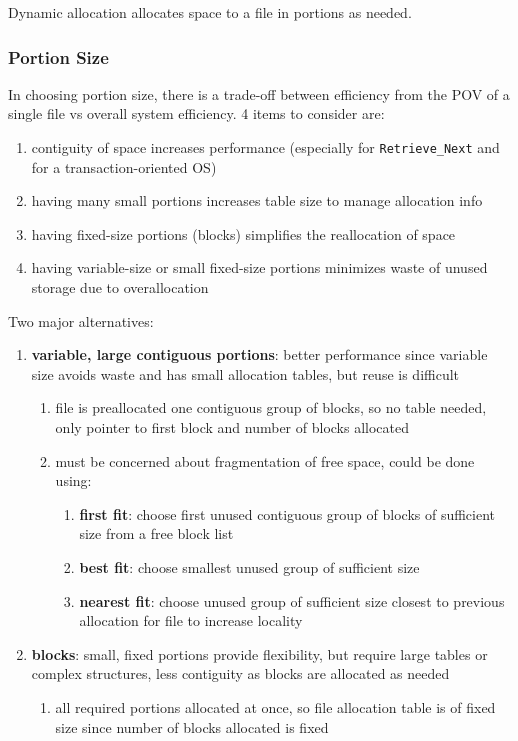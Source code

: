 \documentclass[11pt]{article}
\begin{document}
Dynamic allocation allocates space to a file in portions as needed.
\subsubsection{Portion Size}
\label{sec:orgb5e63d0}
In choosing portion size, there is a trade-off between efficiency from the POV of a single file
vs overall system efficiency. 4 items to consider are:
\begin{enumerate}
\item contiguity of space increases performance (especially for \texttt{Retrieve\_Next} and for a
transaction-oriented OS)
\item having many small portions increases table size to manage allocation info
\item having fixed-size portions (blocks) simplifies the reallocation of space
\item having variable-size or small fixed-size portions minimizes waste of unused storage due to
overallocation
\end{enumerate}

Two major alternatives:
\begin{enumerate}
\item \textbf{variable, large contiguous portions}: better performance since variable size avoids waste
and has small allocation tables, but reuse is difficult
\begin{enumerate}
\item file is preallocated one contiguous group of blocks, so no table needed, only pointer to
first block and number of blocks allocated
\item must be concerned about fragmentation of free space, could be done using:
\begin{enumerate}
\item \textbf{first fit}: choose first unused contiguous group of blocks of sufficient size from a
free block list
\item \textbf{best fit}: choose smallest unused group of sufficient size
\item \textbf{nearest fit}: choose unused group of sufficient size closest to previous allocation for
file to increase locality
\end{enumerate}
\end{enumerate}
\item \textbf{blocks}: small, fixed portions provide flexibility, but require large tables or complex structures,
less contiguity as blocks are allocated as needed
\begin{enumerate}
\item all required portions allocated at once, so file allocation table is of fixed size since
number of blocks allocated is fixed
\end{enumerate}
\end{enumerate}
\end{document}
